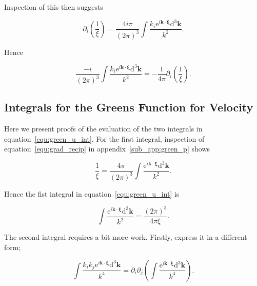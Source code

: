 \documentclass[12pt]{article}
\begin{document}
Inspection of this then suggests

\begin{equation}
\label{equ:grad_recip}
\partial_{i} \left(\frac{1}{\xi}\right) = \frac{4 i \pi}{(2 \pi)^{3}} \int \frac{ k_{i} \mathrm{e}^{i \boldsymbol{k} \cdot \boldsymbol{\xi}} \mathrm{d}^{3} \boldsymbol{k}}{k^{2}} .
\end{equation}

Hence

\begin{equation}
\label{equ:green_p_ident}
\frac{-i}{(2 \pi)^{3}} \int \frac{ k_{i} \mathrm{e}^{i \boldsymbol{k} \cdot \boldsymbol{\xi}} \mathrm{d}^{3} \boldsymbol{k}}{k^{2}} = -\frac{1}{4 \pi} \partial_{i} \left(\frac{1}{\xi}\right) .
\end{equation}

\subsection{Integrals for the Greens Function for Velocity}
\label{sub_app:green_vel}

Here we present proofs of the evaluation of the two integrals in equation~\ref{equ:green_u_int}. For the first integral, inspection of equation~\ref{equ:grad_recip} in appendix~\ref{sub_app:green_p} shows

\begin{equation}
\label{equ:recip_int}
\frac{1}{\xi} = \frac{4 \pi}{(2 \pi)^{3}} \int \frac{\mathrm{e}^{i \boldsymbol{k} \cdot \boldsymbol{\xi}} \mathrm{d}^{3} \boldsymbol{k}}{k^{2}} .
\end{equation}

Hence the fist integral in equation~\ref{equ:green_u_int} is

\begin{equation}
\label{equ:green_u_int1}
\int \frac{\mathrm{e}^{i \boldsymbol{k} \cdot \boldsymbol{\xi}} \mathrm{d}^{3} \boldsymbol{k}}{k^{2}} = \frac{(2 \pi)^{3}}{4 \pi \xi} .
\end{equation}

The second integral requires a bit more work. Firstly, express it in a different form;

\begin{equation}
\label{equ:green_u_int2_new}
\int \frac{k_{i} k_{j} \mathrm{e}^{i \boldsymbol{k} \cdot \boldsymbol{\xi}} \mathrm{d}^{3} \boldsymbol{k}}{k^{4}} = \partial_{i} \partial_{j} \left(\int \frac{\mathrm{e}^{i \boldsymbol{k} \cdot \boldsymbol{\xi}} \mathrm{d}^{3} \boldsymbol{k}}{k^{4}} \right) .
\end{equation}
\end{document}
